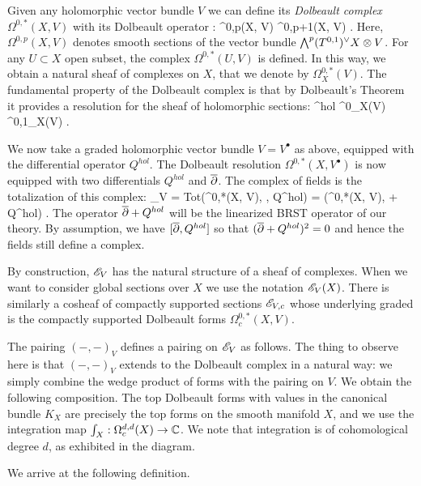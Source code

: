 \documentclass[11pt]{amsart}
\begin{document}
Given any holomorphic vector bundle $V$ we can define its {\em Dolbeault complex} $\Omega^{0,*}(X , V)$ with its Dolbeault operator 
\ben
\dbar : \Omega^{0,p}(X, V) \to \Omega^{0,p+1}(X, V) .
\een
Here, $\Omega^{0,p}(X, V)$ denotes smooth sections of the vector bundle $\bigwedge^p (T^{0,1})^{\vee} X \otimes V$. 
For any $U \subset X$ open subset, the complex $\Omega^{0,*}(U,V)$ is defined. 
In this way, we obtain a natural sheaf of complexes on $X$, that we denote by $\Omega^{0,*}_X(V)$. 
The fundamental property of the Dolbeault complex is that by Dolbeault's Theorem it provides a resolution for the sheaf of holomorphic sections: 
\ben
\sV^{hol} \to \Omega^0_X(V) \xto{\dbar} \Omega^{0,1}_X(V) \xto{\dbar} \cdots .
\een 

We now take a graded holomorphic vector bundle $V = V^{\bullet}$ as above, equipped with the differential operator $Q^{hol}$. 
The Dolbeault resolution $\Omega^{0,*}(X, V^\bullet)$ is now equipped with two differentials $Q^{hol}$ and $\overline{\partial}$. 
The complex of fields is the totalization of this complex:
\ben
\sE_V = {\rm Tot}\left(\Omega^{0,*}(X, V), \dbar, Q^{hol}\right) = \left(\Omega^{0,*}(X, V), \dbar + Q^{hol}\right) .
\een
The operator $\overline{\partial} + Q^{hol}$ will be the linearized BRST operator of our theory.
By assumption, we have $[\overline{\partial}, Q^{hol}]$ so that $(\overline{\partial} + Q^{hol})^2 = 0$ and hence the fields still define a complex. 

By construction, $\mathscr E_V$ has the natural structure of a sheaf of complexes.
When we want to consider global sections over $X$ we use the notation $\mathscr E_V(X)$. 
There is similarly a cosheaf of compactly supported sections $\mathscr E_{V,c}$ whose underlying graded is the compactly supported Dolbeault forms $\Omega^{0,*}_c(X, V)$. 

The pairing $(-,-)_V$ defines a pairing on $\mathscr E_V$ as follows.
The thing to observe here is that $(-,-)_V$ extends to the Dolbeault complex in a natural way: we simply combine the wedge product of forms with the pairing on $V$.
We obtain the following composition. 
\ben
{}
\een
The top Dolbeault forms with values in the canonical bundle $K_X$ are precisely the top forms on the smooth manifold $X$, and we use the integration map $\int_X : \Omega^{d,d}_c(X) \to \mathbb C$. 
We note that integration is of cohomological degree $d$, as exhibited in the diagram. 

We arrive at the following definition. 
\end{document}
